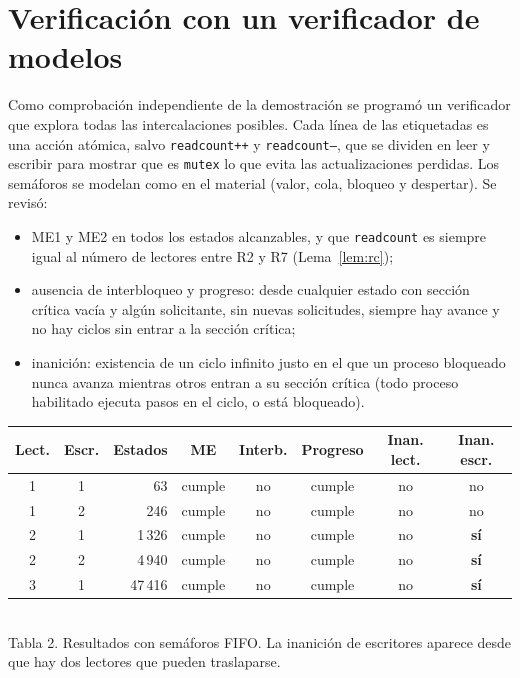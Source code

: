 \documentclass[12pt,letterpaper]{article}
\theoremstyle{definition}
\newcommand{\sem}[1]{\texttt{#1}}
\begin{document}
\section{Verificación con un verificador de modelos}\label{sec:verif}
Como comprobación independiente de la demostración se programó un verificador que explora todas las intercalaciones posibles. Cada línea de las etiquetadas es una acción atómica, salvo \sem{readcount++} y \sem{readcount--}, que se dividen en leer y escribir para mostrar que es \sem{mutex} lo que evita las actualizaciones perdidas. Los semáforos se modelan como en el material (valor, cola, bloqueo y despertar). Se revisó:
\begin{itemize}[itemsep=2pt]
\item ME1 y ME2 en todos los estados alcanzables, y que \sem{readcount} es siempre igual al número de lectores entre R2 y R7 (Lema~\ref{lem:rc});
\item ausencia de interbloqueo y progreso: desde cualquier estado con sección crítica vacía y algún solicitante, sin nuevas solicitudes, siempre hay avance y no hay ciclos sin entrar a la sección crítica;
\item inanición: existencia de un ciclo infinito justo en el que un proceso bloqueado nunca avanza mientras otros entran a su sección crítica (todo proceso habilitado ejecuta pasos en el ciclo, o está bloqueado).
\end{itemize}
\begin{center}
\small
\setlength{\tabcolsep}{4pt}
\begin{tabular}{|c|c|r|c|c|c|c|c|}
\hline
\textbf{Lect.} & \textbf{Escr.} & \textbf{Estados} & \textbf{ME} & \textbf{Interb.} & \textbf{Progreso} & \textbf{Inan. lect.} & \textbf{Inan. escr.}\\
\hline
1 & 1 & 63 & cumple & no & cumple & no & no\\ \hline
1 & 2 & 246 & cumple & no & cumple & no & no\\ \hline
2 & 1 & 1\,326 & cumple & no & cumple & no & \textbf{sí}\\ \hline
2 & 2 & 4\,940 & cumple & no & cumple & no & \textbf{sí}\\ \hline
3 & 1 & 47\,416 & cumple & no & cumple & no & \textbf{sí}\\ \hline
\end{tabular}\\[3pt]
{\footnotesize Tabla 2. Resultados con semáforos FIFO. La inanición de escritores aparece desde que hay dos lectores que pueden traslaparse.}
\end{center}
\end{document}
